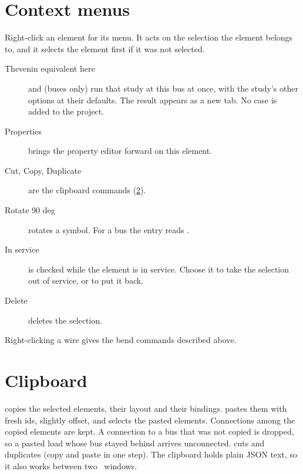 \section{Context menus}

\begin{minipage}[t]{0.62\linewidth}
Right-click an element for its menu. It acts on the selection the element belongs to, and
it selects the element first if it was not selected.

\begin{description}
  \item[Thevenin equivalent here] and  (buses only)
    run that study at this bus at once, with the study's other options at their defaults. The
    result appears as a new tab. No case is added to the project.
  \item[Properties] brings the property editor forward on this element.
  \item[Cut, Copy, Duplicate] are the clipboard commands (\cref{sec:clipboard}).
  \item[Rotate 90 deg] rotates a symbol. For a bus the entry reads .
  \item[In service] is checked while the element is in service. Choose it to take the
    selection out of service, or to put it back.
  \item[Delete] deletes the selection.
\end{description}
\end{minipage}\hfill
\begin{minipage}[t]{0.33\linewidth}\vspace{0pt}
  \centering{}
\end{minipage}

Right-clicking a wire gives the bend commands described above.

\section{Clipboard}\label{sec:clipboard}

 copies the selected elements, their layout and their bindings.
 pastes them with fresh ids, slightly offset, and selects the pasted
elements. Connections among the copied elements are kept. A connection to a bus that was
not copied is dropped, so a pasted load whose bus stayed behind arrives unconnected.
 cuts and  duplicates (copy and paste in one step). The
clipboard holds plain JSON text, so it also works between two \app\ windows.

